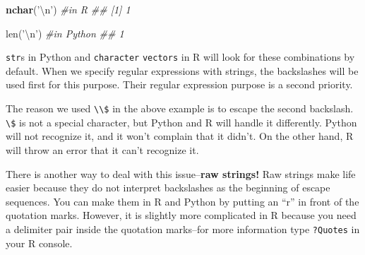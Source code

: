 \documentclass[12pt,krantz2]{krantz}
\makeatletter
\newenvironment{Shaded}{\begin{snugshade}}{\end{snugshade}}
\newcommand{\BuiltInTok}[1]{#1}
\newcommand{\CharTok}[1]{\textcolor[rgb]{0.5,0.5,0.5}{#1}}
\newcommand{\CommentTok}[1]{\textcolor[rgb]{0.37,0.37,0.37}{\textit{#1}}}
\newcommand{\KeywordTok}[1]{\textcolor[rgb]{0.27,0.27,0.27}{\textbf{#1}}}
\newcommand{\NormalTok}[1]{#1}
\newcommand{\StringTok}[1]{\textcolor[rgb]{0.5,0.5,0.5}{#1}}
\newenvironment{kframe}{%
\medskip{}
\setlength{\fboxsep}{.8em}
 \def\at@end@of@kframe{}%
 \ifinner\ifhmode%
  \def\at@end@of@kframe{\end{minipage}}%
  \begin{minipage}{\columnwidth}%
 \fi\fi%
 \def\FrameCommand##1{\hskip\@totalleftmargin \hskip-\fboxsep
 \colorbox{shadecolor}{##1}\hskip-\fboxsep
     \hskip-\linewidth \hskip-\@totalleftmargin \hskip\columnwidth}%
 \MakeFramed {\advance\hsize-\width
   \@totalleftmargin\z@ \linewidth\hsize
   \@setminipage}}%
 {\par\unskip\endMakeFramed%
 \at@end@of@kframe}
\renewenvironment{Shaded}{\begin{kframe}}{\end{kframe}}
\makeatother
\begin{document}
\begin{Shaded}
\begin{Highlighting}[]
\KeywordTok{nchar}\NormalTok{(}\StringTok{'}\CharTok{\textbackslash{}n}\StringTok{'}\NormalTok{) }\CommentTok{#in R}
\CommentTok{## [1] 1}
\end{Highlighting}
\end{Shaded}

\begin{Shaded}
\begin{Highlighting}[]
\BuiltInTok{len}\NormalTok{(}\StringTok{'}\CharTok{\textbackslash{}n}\StringTok{'}\NormalTok{) }\CommentTok{#in Python}
\CommentTok{## 1}
\end{Highlighting}
\end{Shaded}

\texttt{str}s in Python and \texttt{character} \texttt{vectors} in R will look for these combinations by default. When we specify regular expressions with strings, the backslashes will be used first for this purpose. Their regular expression purpose is a second priority.

The reason we used \texttt{\textbackslash{}\textbackslash{}\$} in the above example is to escape the second backslash. \texttt{\textbackslash{}\$} is not a special character, but Python and R will handle it differently. Python will not recognize it, and it won't complain that it didn't. On the other hand, R will throw an error that it can't recognize it.

\begin{Shaded}
\end{Shaded}

\begin{Shaded}
\end{Shaded}

There is another way to deal with this issue--\textbf{raw strings!} Raw strings make life easier because they do not interpret backslashes as the beginning of escape sequences. You can make them in R and Python by putting an ``r'' in front of the quotation marks. However, it is slightly more complicated in R because you need a delimiter pair inside the quotation marks--for more information type \texttt{?Quotes} in your R console.
\end{document}
